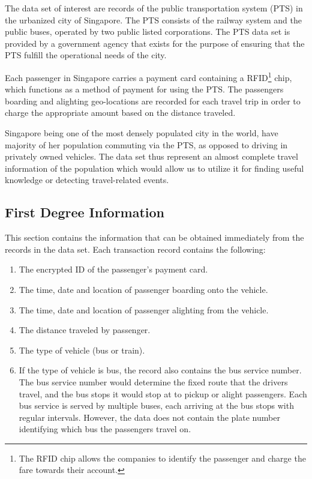\documentclass[10pt]{article}
\begin{document}
The data set of interest are records of the public transportation system (PTS) in the urbanized city of Singapore. The PTS consists of the railway system and the public buses, operated by two public listed corporations. The PTS data set is provided by a government agency that exists for the purpose of ensuring that the PTS fulfill the operational needs of the city.

Each passenger in Singapore carries a payment card containing a RFID\footnote{The RFID chip allows the companies to identify the passenger and charge the fare towards their account.} chip, which functions as a method of payment for using the PTS. The passengers boarding and alighting geo-locations are recorded for each travel trip in order to charge the appropriate amount based on the distance traveled.

Singapore being one of the most densely populated city in the world, have majority of her population commuting via the PTS, as opposed to driving in privately owned vehicles. The data set thus represent an almost complete travel information of the population which would allow us to utilize it for finding useful knowledge or detecting travel-related events.

\subsection{First Degree Information}
This section contains the information that can be obtained immediately from the records in the data set. Each transaction record contains the following:

\begin{enumerate}
	\item The encrypted ID of the passenger's payment card.
	\item The time, date and location of passenger boarding onto the vehicle.
	\item The time, date and location of passenger alighting from the vehicle.
	\item The distance traveled by passenger.
	\item The type of vehicle (bus or train).
	\item If the type of vehicle is bus, the record also contains the bus service number. The bus service number would determine the fixed route that the drivers travel, and the bus stops it would stop at to pickup or alight passengers. Each bus service is served by multiple buses, each arriving at the bus stops with regular intervals. However, the data does not contain the plate number identifying which bus the passengers travel on.
\end{enumerate}
\end{document}
